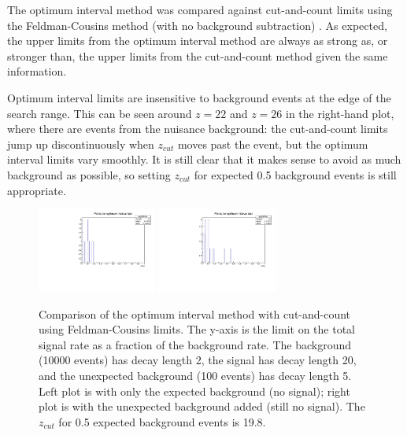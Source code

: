 The optimum interval method was compared against cut-and-count limits using the Feldman-Cousins method (with no background subtraction) \cite{feldman_unified_1998}.
As expected, the upper limits from the optimum interval method are always as strong as, or stronger than, the upper limits from the cut-and-count method given the same information.

Optimum interval limits are insensitive to background events at the edge of the search range.
This can be seen around $z=22$ and $z=26$ in the right-hand plot, where there are events from the nuisance background: the cut-and-count limits jump up discontinuously when $z_{cut}$ moves past the event, but the optimum interval limits vary smoothly.
It is still clear that it makes sense to avoid as much background as possible, so setting $z_{cut}$ for expected 0.5 background events is still appropriate.

\begin{figure}[ht]
\begin{center}
    \includegraphics[width=0.35\textwidth,page=6,angle=-90]{vertexing/figs/toy_nothing}
    \includegraphics[width=0.35\textwidth,page=6,angle=-90]{vertexing/figs/toy_nosignal}
\end{center}
    \caption{Comparison of the optimum interval method with cut-and-count using Feldman-Cousins limits. The y-axis is the limit on the total signal rate as a fraction of the background rate. 
        The background (10000 events) has decay length 2, the signal has decay length 20, and the unexpected background (100 events) has decay length 5. Left plot is with only the expected background (no signal); right plot is with the unexpected background added (still no signal). The $z_{cut}$ for 0.5 expected background events is 19.8.}
    \label{fig:optimum_interval_demo}
\end{figure}

